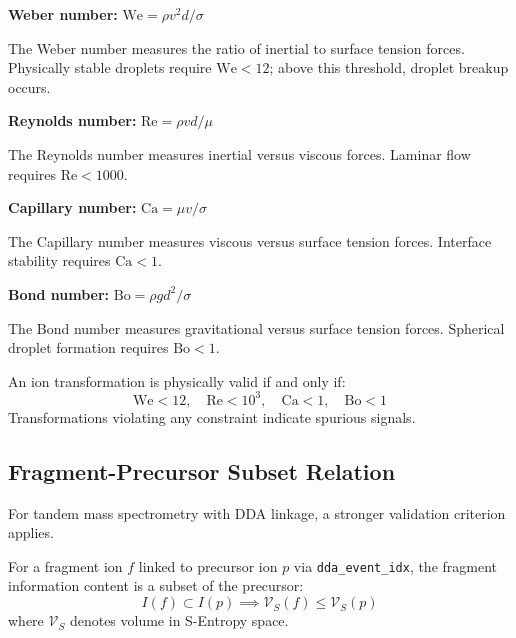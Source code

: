 \textbf{Weber number:} $\mathrm{We} = \rho v^2 d / \sigma$

The Weber number measures the ratio of inertial to surface tension forces. Physically stable droplets require $\mathrm{We} < 12$; above this threshold, droplet breakup occurs.

\textbf{Reynolds number:} $\mathrm{Re} = \rho v d / \mu$

The Reynolds number measures inertial versus viscous forces. Laminar flow requires $\mathrm{Re} < 1000$.

\textbf{Capillary number:} $\mathrm{Ca} = \mu v / \sigma$

The Capillary number measures viscous versus surface tension forces. Interface stability requires $\mathrm{Ca} < 1$.

\textbf{Bond number:} $\mathrm{Bo} = \rho g d^2 / \sigma$

The Bond number measures gravitational versus surface tension forces. Spherical droplet formation requires $\mathrm{Bo} < 1$.

\begin{theorem}
An ion transformation is physically valid if and only if:
\begin{equation}
    \mathrm{We} < 12, \quad \mathrm{Re} < 10^3, \quad \mathrm{Ca} < 1, \quad \mathrm{Bo} < 1
\end{equation}
Transformations violating any constraint indicate spurious signals.
\end{theorem}

\subsection{Fragment-Precursor Subset Relation}

For tandem mass spectrometry with DDA linkage, a stronger validation criterion applies.

\begin{theorem}
For a fragment ion $f$ linked to precursor ion $p$ via \texttt{dda\_event\_idx}, the fragment information content is a subset of the precursor:
\begin{equation}
    I(f) \subset I(p) \implies \mathcal{V}_S(f) \leq \mathcal{V}_S(p)
\end{equation}
where $\mathcal{V}_S$ denotes volume in S-Entropy space.
\end{theorem}

